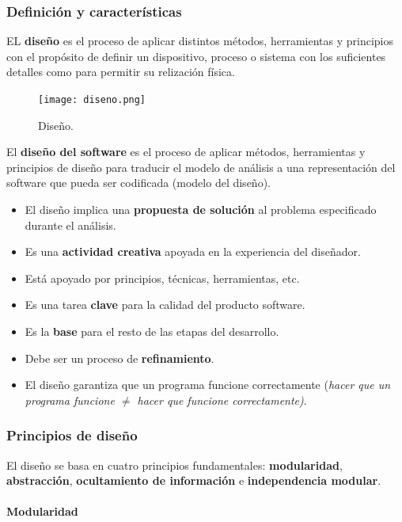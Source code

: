 \documentclass[12pt,spanish]{article}
\begin{document}
\subsubsection{Definición y características}

EL \textbf{diseño} es el proceso de aplicar distintos métodos, herramientas y principios con el propósito de definir un dispositivo, proceso o sistema con los suficientes detalles como para permitir su relización física.

\begin{figure}[H]
\centering
\texttt{[image: diseno.png]}
\caption{Diseño.}
\end{figure}

El \textbf{diseño del software} es el proceso de aplicar métodos, herramientas y principios de diseño para traducir el modelo de análisis a una representación del software que pueda ser codificada (modelo del diseño).

\begin{itemize}
	\item El diseño implica una \textbf{propuesta de solución} al problema especificado durante el análisis.
	\item Es una \textbf{actividad creativa} apoyada en la experiencia del diseñador.
	\item Está apoyado por principios, técnicas, herramientas, etc.
	\item Es una tarea \textbf{clave} para la calidad del producto software.
	\item Es la \textbf{base} para el resto de las etapas del desarrollo.
	\item Debe ser un proceso de \textbf{refinamiento}.
	\item El diseño garantiza que un programa funcione correctamente (\emph{hacer que un programa funcione $\neq$ hacer que funcione correctamente)}.
\end{itemize}

\subsubsection{Principios de diseño}

El diseño se basa en cuatro principios fundamentales: \textbf{modularidad}, \textbf{abstracción}, \textbf{ocultamiento de información} e \textbf{independencia modular}.


\paragraph{Modularidad\\}
\end{document}
